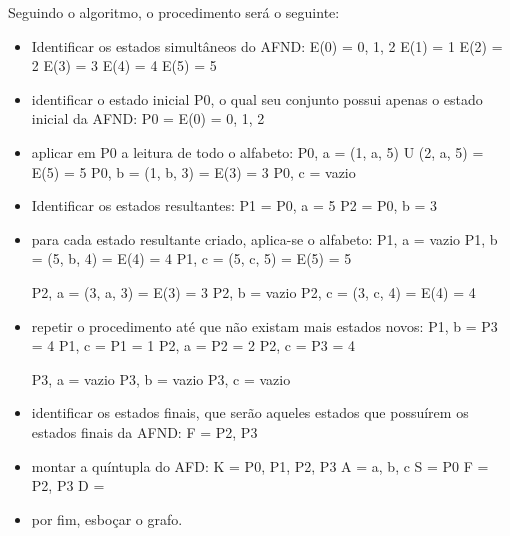 \documentclass[a4paper,10pt]{article} %
\begin{document}
    Seguindo o algoritmo, o procedimento será o seguinte:
    \begin{itemize}
        \item Identificar os estados simultâneos do AFND:
            E(0) = {0, 1, 2}
            E(1) = {1}
            E(2) = {2}
            E(3) = {3}
            E(4) = {4}
            E(5) = {5}
        \item identificar o estado inicial P0, o qual seu conjunto possui apenas o estado inicial da AFND:
            P0 = E(0) = {0, 1, 2}
        \item aplicar em P0 a leitura de todo o alfabeto:
            P0, a = (1, a, 5) U (2, a, 5) = E(5) = {5}
            P0, b = (1, b, 3) = E(3) = {3}
            P0, c = vazio
        \item Identificar os estados resultantes:
            P1 = P0, a = {5}
            P2 = P0, b = {3}
        \item para cada estado resultante criado, aplica-se o alfabeto:
            P1, a = vazio
            P1, b = (5, b, 4) = E(4) = {4}
            P1, c = (5, c, 5) = E(5) = {5}
            
            P2, a = (3, a, 3) = E(3) = {3}
            P2, b = vazio
            P2, c = (3, c, 4) = E(4) = {4}
        \item repetir o procedimento até que não existam mais estados novos:
            P1, b = P3 = {4}
            P1, c = P1 = {1}
            P2, a = P2 = {2}
            P2, c = P3 = {4}

            P3, a = vazio
            P3, b = vazio
            P3, c = vazio
        \item identificar os estados finais, que serão aqueles estados que possuírem os estados finais da AFND:
            F = {P2, P3}
        \item montar a quíntupla do AFD:
            K = {P0, P1, P2, P3}
            A = {a, b, c}
            S = {P0}
            F = {P2, P3}
            D =
        \item por fim, esboçar o grafo.    
    \end{itemize}
\end{document}
